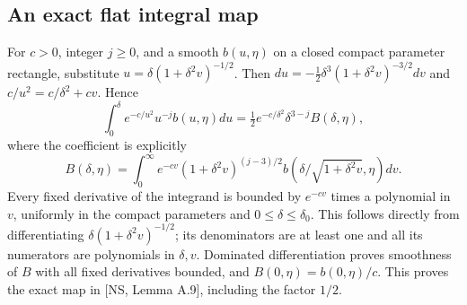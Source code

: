 \documentclass[10pt,a4paper]{article}
\begin{document}
\subsection{An exact flat integral map}
For $c>0$, integer $j\ge0$, and a smooth $b(u,\eta)$ on a closed compact
parameter rectangle, substitute $u=\delta(1+\delta^2v)^{-1/2}$.
Then $du=-\tfrac12\delta^3(1+\delta^2v)^{-3/2}dv$ and
$c/u^2=c/\delta^2+cv$. Hence
\begin{equation}\label{eq:flat}
\int_0^\delta e^{-c/u^2}u^{-j}b(u,\eta)du
=\tfrac12e^{-c/\delta^2}\delta^{3-j}B(\delta,\eta),
\end{equation}
where the coefficient is explicitly
\[
B(\delta,\eta)=\int_0^\infty e^{-cv}(1+\delta^2v)^{(j-3)/2}
b(\delta/\sqrt{1+\delta^2v},\eta)dv.
\]
Every fixed derivative of the integrand is bounded by $e^{-cv}$ times a
polynomial in $v$, uniformly in the compact parameters and $0\le\delta\le\delta_0$.
This follows directly from differentiating $\delta(1+\delta^2v)^{-1/2}$;
its denominators are at least one and all its numerators are polynomials in
$\delta,v$. Dominated differentiation proves smoothness of $B$ with all
fixed derivatives bounded, and $B(0,\eta)=b(0,\eta)/c$.
This proves the exact map in [NS, Lemma A.9], including the factor $1/2$.
\end{document}
